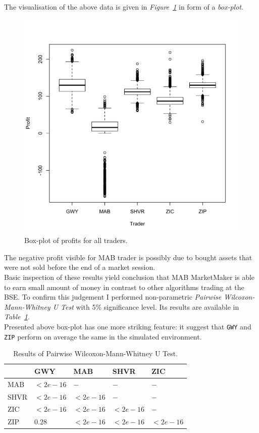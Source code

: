 \documentclass{llncs}
\begin{document}
The visualisation of the above data is given in \emph{Figure~\ref{fig:box}} in form of a \emph{box-plot}.\\

\begin{figure}[ht]
  \centering
  \includegraphics[width=.7\textwidth]{fig/box.pdf}
  \caption{Box-plot of profits for all traders.\label{fig:box}}
\end{figure}

The negative profit visible for MAB trader is possibly due to bought assets that were not sold before the end of a market session.\\
Basic inspection of these results yield conclusion that MAB MarketMaker is able to earn small amount of money in contrast to other algorithms trading at the BSE. To confirm this judgement I performed non-parametric \emph{Pairwise Wilcoxon-Mann-Whitney U Test} with 5\% significance level. Its results are available in \emph{Table~\ref{tab:wilcox}}.\\
Presented above box-plot has one more striking feature: it suggest that \texttt{GWY} and \texttt{ZIP} perform on average the same in the simulated environment.\\

\begin{table}[ht]
  \centering
  \begin{tabular}{ p{5em} | p{5em} p{5em} p{5em} p{5em} }
         &GWY    &MAB    &SHVR   &ZIC   \\
    \hline
    MAB  &$<2e-16 $&$-      $&$-      $&$-     $\\
    SHVR &$<2e-16 $&$<2e-16 $&$-      $&$-     $\\
    ZIC  &$<2e-16 $&$<2e-16 $&$<2e-16 $&$-     $\\
    ZIP  &$0.28   $&$<2e-16 $&$<2e-16 $&$<2e-16$
  \end{tabular}
  \vspace*{1em}
  \caption{Results of Pairwise Wilcoxon-Mann-Whitney U Test.\label{tab:wilcox}}
\end{table}
\end{document}
